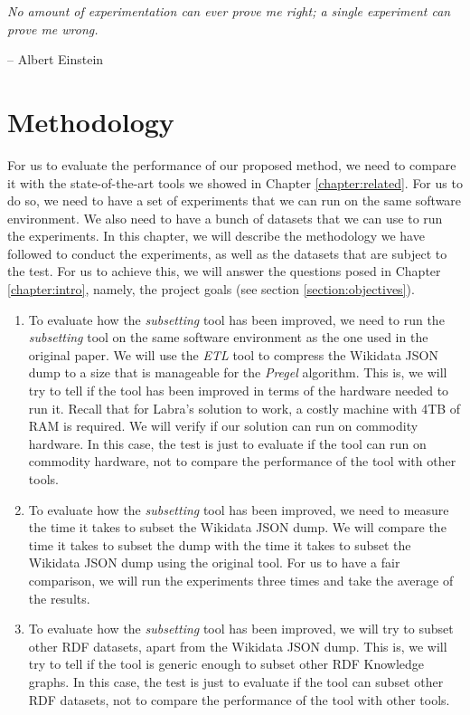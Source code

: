 \epigraph{\textit{No amount of experimentation can ever prove me right; a single experiment can prove me wrong.}}{-- \textup{Albert Einstein}}

\section{Methodology}

For us to evaluate the performance of our proposed method, we need to compare it with the state-of-the-art tools we showed in Chapter \ref{chapter:related}. For us to do so, we need to have a set of experiments that we can run on the same software environment. We also need to have a bunch of datasets that we can use to run the experiments. In this chapter, we will describe the methodology we have followed to conduct the experiments, as well as the datasets that are subject to the test. For us to achieve this, we will answer the questions posed in Chapter \ref{chapter:intro}, namely, the project goals (see section \ref{section:objectives}).

\begin{enumerate}
    \itemsep0.5em
    \item To evaluate how the \textit{subsetting} tool has been improved, we need to run the \textit{subsetting} tool on the same software environment as the one used in the original paper. We will use the \textit{ETL} tool to compress the Wikidata JSON dump to a size that is manageable for the \textit{Pregel} algorithm. This is, we will try to tell if the tool has been improved in terms of the hardware needed to run it. Recall that for Labra's \cite{https://doi.org/10.48550/arxiv.2110.11709} solution to work, a costly machine with 4TB of RAM is required. We will verify if our solution can run on commodity hardware. In this case, the test is just to evaluate if the tool can run on commodity hardware, not to compare the performance of the tool with other tools.
    \item To evaluate how the \textit{subsetting} tool has been improved, we need to measure the time it takes to subset the Wikidata JSON dump. We will compare the time it takes to subset the dump with the time it takes to subset the Wikidata JSON dump using the original tool. For us to have a fair comparison, we will run the experiments three times and take the average of the results.
    \item To evaluate how the \textit{subsetting} tool has been improved, we will try to subset other RDF datasets, apart from the Wikidata JSON dump. This is, we will try to tell if the tool is generic enough to subset other RDF Knowledge graphs. In this case, the test is just to evaluate if the tool can subset other RDF datasets, not to compare the performance of the tool with other tools.
\end{enumerate}

